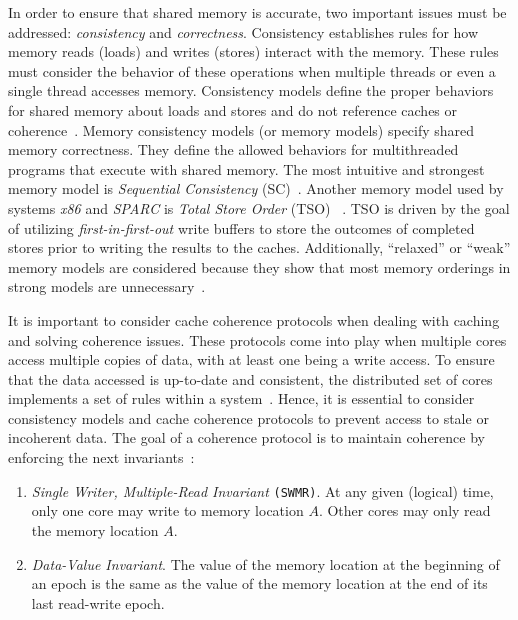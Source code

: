 In order to ensure that shared memory is accurate, two important issues must be addressed: \emph{consistency} and \emph{correctness}. Consistency establishes rules for how memory reads (loads) and writes (stores) interact with the memory. These rules must consider the behavior of these operations when multiple threads or even a single thread accesses memory. Consistency models define the proper behaviors for shared memory about loads and stores and do not reference caches or coherence~\cite{DBLP_series_synthesis_2020Nagarajan}. Memory consistency models (or memory models) specify shared memory correctness. They define the allowed behaviors for multithreaded programs that execute with shared memory. The most intuitive and strongest memory model is \emph{Sequential Consistency} (SC)~\cite{lamport1979how}. Another memory model used by systems \emph{x86} and \emph{SPARC} is \emph{Total Store Order} (TSO) ~\cite{DBLP_conf_tphol_OwensSS09, DBLP_journals_cacm_SewellSONM10, sparc1992sparc}. TSO is driven by the goal of utilizing \emph{first-in-first-out} write buffers to store the outcomes of completed stores prior to writing the results to the caches. Additionally, ``relaxed'' or ``weak'' memory models are considered because they show that most memory orderings in strong models are unnecessary~\cite{DBLP_series_synthesis_2020Nagarajan}.


It is important to consider cache coherence protocols when dealing with caching and solving coherence issues. These protocols come into play when multiple cores access multiple copies of data, with at least one being a write access. To ensure that the data accessed is up-to-date and consistent, the distributed set of cores implements a set of rules within a system~\cite{DBLP_series_synthesis_2020Nagarajan}. Hence, it is essential to consider consistency models and cache coherence protocols to prevent access to stale or incoherent data. The goal of a coherence protocol is to maintain coherence by enforcing the next invariants~\cite{DBLP_series_synthesis_2020Nagarajan}:

\begin{enumerate}
  \item \emph{Single Writer, Multiple-Read Invariant} \texttt{(SWMR)}. At any given
 (logical) time, only one core may write to memory location \(A\). Other cores may only read the memory location \(A\).

  \item \emph{Data-Value Invariant}. The value of the memory location at the beginning of an epoch is the same as the value of the memory location at the end of its last read-write epoch.
\end{enumerate}

